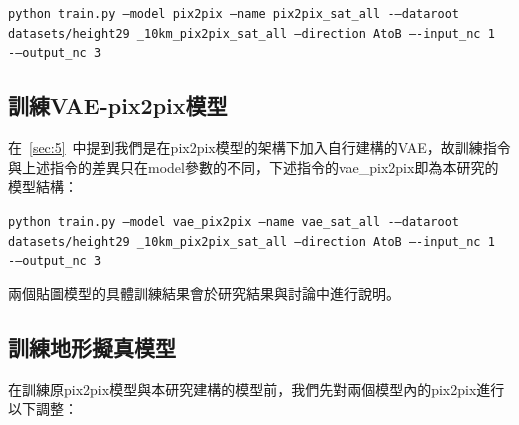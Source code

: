 \documentclass[a4paper, 12pt]{article}
\begin{document}
\begin{center}
\texttt{python train.py --model pix2pix --name pix2pix\_sat\_all -–dataroot datasets/height29 \_10km\_pix2pix\_sat\_all --direction AtoB –-input\_nc 1 -–output\_nc 3}    
\end{center}


\subsection{訓練VAE-pix2pix模型}
在~\ref{sec:5}~中提到我們是在pix2pix模型的架構下加入自行建構的VAE，故訓練指令與上述指令的差異只在model參數的不同，下述指令的vae\_pix2pix即為本研究的模型結構：

\begin{center}
\texttt{python train.py --model vae\_pix2pix --name vae\_sat\_all -–dataroot datasets/height29 \_10km\_pix2pix\_sat\_all --direction AtoB –-input\_nc 1 -–output\_nc 3}
\end{center}

兩個貼圖模型的具體訓練結果會於研究結果與討論中進行說明。

\subsection{訓練地形擬真模型}
在訓練原pix2pix模型與本研究建構的模型前，我們先對兩個模型內的pix2pix進行以下調整：
\end{document}
